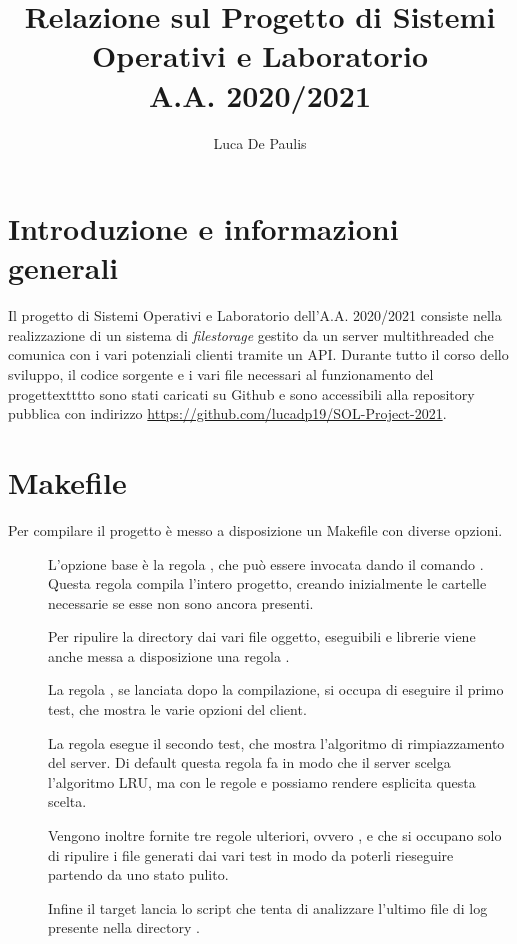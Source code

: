 \documentclass[11pt,oneface]{article}
\author{Luca De Paulis}
\title{Relazione sul Progetto di Sistemi Operativi e Laboratorio \\
    \large A.A. 2020/2021 }
\begin{document}
\maketitle

\section{Introduzione e informazioni generali}
Il progetto di Sistemi Operativi e Laboratorio dell'A.A. 2020/2021 consiste nella realizzazione
di un sistema di \emph{filestorage} gestito da un server multithreaded che comunica con i vari
potenziali clienti tramite un API. Durante tutto il corso dello sviluppo, il codice sorgente e
i vari file necessari al funzionamento del progettextttto sono stati caricati su Github e sono accessibili
alla repository pubblica con indirizzo \url{https://github.com/lucadp19/SOL-Project-2021}.

\section{Makefile}
Per compilare il progetto è messo a disposizione un Makefile con diverse opzioni. 
\begin{description}
    \item[]  L'opzione base è la regola , che può essere invocata dando il comando .
        Questa regola compila l'intero progetto, creando inizialmente le cartelle necessarie se esse non sono ancora presenti.
    \item[] Per ripulire la directory dai vari file oggetto, eseguibili e librerie viene anche messa a disposizione una regola .
    \item[] La regola , se lanciata dopo la compilazione, si occupa di eseguire il primo test, che mostra le varie opzioni del client.
    \item[] La regola  esegue il secondo test, che mostra l'algoritmo di rimpiazzamento del server. Di default questa regola fa in modo che il server scelga l'algoritmo LRU, ma con le regole  e  possiamo rendere esplicita questa scelta.
    \item[] Vengono inoltre fornite tre regole ulteriori, ovvero ,  e  che si occupano solo di ripulire i file generati dai vari test in modo da poterli rieseguire partendo da uno stato pulito. 
    \item[] Infine il target  lancia lo script  che tenta di analizzare l'ultimo file di log presente nella directory .
\end{description}
\end{document}
